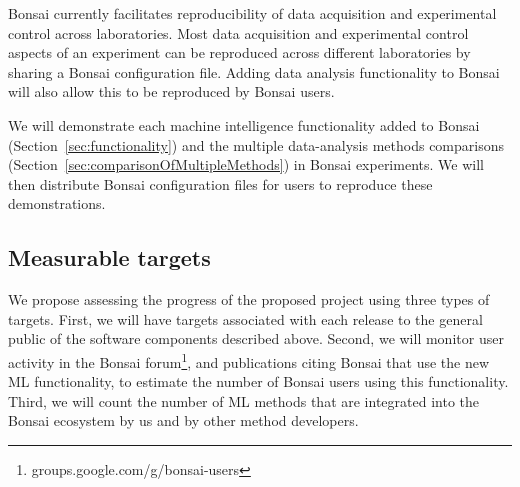 Bonsai currently facilitates reproducibility of data acquisition
and experimental control across laboratories. Most data acquisition and
experimental control aspects of an experiment can be reproduced across
different laboratories by sharing a Bonsai configuration file. Adding data analysis functionality to Bonsai will also allow this to be reproduced by Bonsai users. 
%

We will demonstrate each machine intelligence functionality added to Bonsai
(Section~\ref{sec:functionality}) and the multiple
data-analysis methods comparisons
(Section~\ref{sec:comparisonOfMultipleMethods}) in Bonsai experiments. We will
then distribute Bonsai configuration files for users to reproduce these
demonstrations.

\subsection{Measurable targets}
\label{sec:measurableTargets}

We propose assessing the progress of the proposed project using three 
types of targets.
%
First, we will have targets associated with each release to the general public
of the software components described above. 
%
Second, we will monitor user activity in the Bonsai
forum\footnote{groups.google.com/g/bonsai-users},
and publications citing Bonsai that use the new ML functionality,
to estimate the number of Bonsai users using this functionality.
%
Third, we will count the number of ML methods that are integrated
into the Bonsai ecosystem by us and by other method developers.

